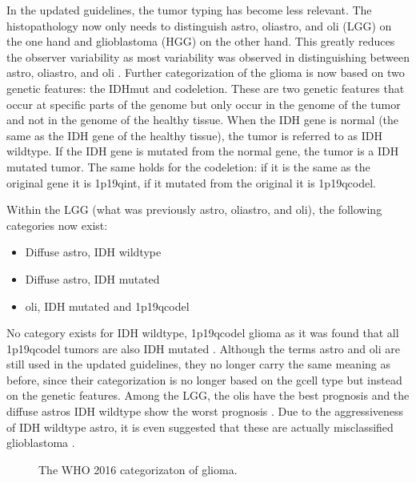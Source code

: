 In the updated guidelines, the \gls{tumor} typing has become less relevant.
The histopathology now only needs to distinguish \gls{astro}, \gls{oliastro}, and \gls{oli} (\gls{LGG}) on the one hand and \gls{glioblastoma} (\gls{HGG}) on the other hand.
This greatly reduces the observer variability as most variability was observed in distinguishing between \gls{astro}, \gls{oliastro}, and \gls{oli} \autocite{mittler1996gradingreliability}.
Further categorization of the \gls{glioma} is now based on two genetic features:  the \gls{IDHmut} and \gls{codeletion}.
These are two genetic features that occur at specific parts of the genome but only occur in the genome of the \gls{tumor} and not in the genome of the healthy tissue.
When the \gls{IDH} gene is normal (the same as the \gls{IDH} gene of the healthy tissue), the \gls{tumor} is referred to as \gls{IDH} wildtype.
If the \gls{IDH} gene is mutated from the normal gene, the \gls{tumor} is a \gls{IDH} mutated \gls{tumor}.
The same holds for the \gls{codeletion}: if it is the same as the original gene it is \acl{1p19qint}, if it mutated from the original it is \acl{1p19qcodel}.

Within the \gls{LGG} (what was previously \gls{astro}, \gls{oliastro}, and \gls{oli}), the following categories now exist:
\begin{itemize}
    \item Diffuse \gls{astro}, \gls{IDH} wildtype
    \item Diffuse \gls{astro}, \gls{IDH} mutated
    \item \Gls{oli}, \gls{IDH} mutated and \acl{1p19qcodel}
\end{itemize}
No category exists for \gls{IDH} wildtype, \acl{1p19qcodel} \gls{glioma} as it was found that all \acl{1p19qcodel} \glspl{tumor} are also \gls{IDH} mutated \autocite{labussi20101p19qcodeletedIDH}.
Although the terms \gls{astro} and \gls{oli} are still used in the updated guidelines, they no longer carry the same meaning as before, since their categorization is no longer based on the \gls{gcell} type but instead on the genetic features.
Among the \gls{LGG}, the \glspl{oli} have the best prognosis and the diffuse \glspl{astro} \gls{IDH} wildtype show the worst prognosis \autocite{eckel2015gliomagroups}.
Due to the aggressiveness of \gls{IDH} wildtype \gls{astro}, it is even suggested that these are actually misclassified \gls{glioblastoma} \autocite{hartmann2010IDH1gbm, brat2018IMPACT}.


\begin{figure}[hbt]
    \centering
    \caption{The WHO 2016 categorizaton of glioma.}\label{fig:intro_glioma_categorization}
\end{figure}

